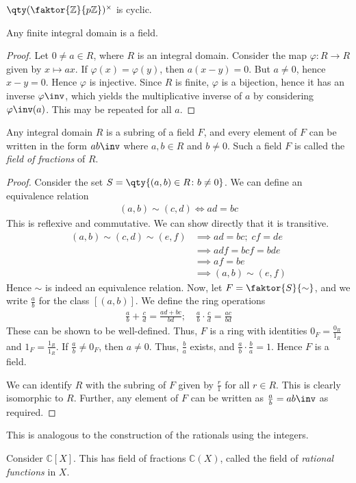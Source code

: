 \begin{example}
	$\qty(\faktor{\mathbb Z}{p\mathbb Z})^\times$ is cyclic.
\end{example}
\begin{proposition}
	Any finite integral domain is a field.
\end{proposition}
\begin{proof}
	Let $0 \neq a \in R$, where $R$ is an integral domain.
	Consider the map $\varphi \colon R \to R$ given by $x \mapsto ax$.
	If $\varphi(x) = \varphi(y)$, then $a(x-y) = 0$.
	But $a \neq 0$, hence $x - y = 0$.
	Hence $\varphi$ is injective.
	Since $R$ is finite, $\varphi$ is a bijection, hence it has an inverse $\varphi\inv$, which yields the multiplicative inverse of $a$ by considering $\varphi\inv(a)$.
	This may be repeated for all $a$.
\end{proof}
\begin{theorem}
	Any integral domain $R$ is a subring of a field $F$, and every element of $F$ can be written in the form $ab\inv$ where $a, b \in R$ and $b \neq 0$.
	Such a field $F$ is called the \textit{field of fractions} of $R$.
\end{theorem}
\begin{proof}
	Consider the set $S = \qty{(a,b) \in R \colon b \neq 0}$.
	We can define an equivalence relation
	\begin{align*}
		(a,b) \sim (c,d) \iff ad = bc
	\end{align*}
	This is reflexive and commutative.
	We can show directly that it is transitive.
	\begin{align*}
		(a,b) \sim (c,d) \sim (e,f) & \implies ad = bc;\; cf = de \\
		                            & \implies adf = bcf = bde    \\
		                            & \implies af = be            \\
		                            & \implies (a,b) \sim (e,f)
	\end{align*}
	Hence $\sim$ is indeed an equivalence relation.
	Now, let $F = \faktor{S}{\sim}$, and we write $\frac{a}{b}$ for the class $[(a,b)]$.
	We define the ring operations
	\begin{align*}
		\frac{a}{b} + \frac{c}{d} = \frac{ad + bc}{bd};\quad \frac{a}{b} \cdot \frac{c}{d} = \frac{ac}{bd}
	\end{align*}
	These can be shown to be well-defined.
	Thus, $F$ is a ring with identities $0_F = \frac{0_R}{1_R}$ and $1_F = \frac{1_R}{1_R}$.
	If $\frac{a}{b} \neq 0_F$, then $a \neq 0$.
	Thus, $\frac{b}{a}$ exists, and $\frac{a}{b} \cdot \frac{b}{a} = 1$.
	Hence $F$ is a field.

	We can identify $R$ with the subring of $F$ given by $\frac{r}{1}$ for all $r \in R$.
	This is clearly isomorphic to $R$.
	Further, any element of $F$ can be written as $\frac{a}{b} = ab\inv$ as required.
\end{proof}
This is analogous to the construction of the rationals using the integers.
\begin{example}
	Consider $\mathbb C[X]$.
	This has field of fractions $\mathbb C(X)$, called the field of \textit{rational functions} in $X$.
\end{example}

